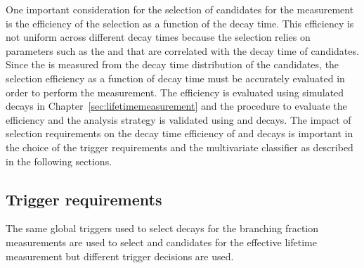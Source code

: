 One important consideration for the selection of candidates for the \bsmumu \el measurement is the efficiency of the selection as a function of the \bs decay time. This efficiency is not uniform across different decay times because the selection relies on parameters such as the \chiIP and \chiFD that are correlated with the decay time of \bsmumu candidates.
Since the \el is measured from the decay time distribution of the candidates, the selection efficiency as a function of decay time must be accurately evaluated in order to perform the measurement. The efficiency is evaluated using simulated \bsmumu decays in Chapter~\ref{sec:lifetimemeasurement}
and the procedure to evaluate the efficiency and the analysis strategy is validated using \bdkpi and \bskk decays. The impact of selection requirements on the decay time efficiency of \bsmumu and \bhh decays is important in the choice of the trigger requirements and the multivariate classifier as described in the following sections.







\subsection{Trigger requirements}
\label{sec:ELtrigger}
The same global triggers used to select decays for the branching fraction measurements are used to select \bsmumu and \bhh candidates for the effective lifetime measurement but different trigger decisions are used. 

